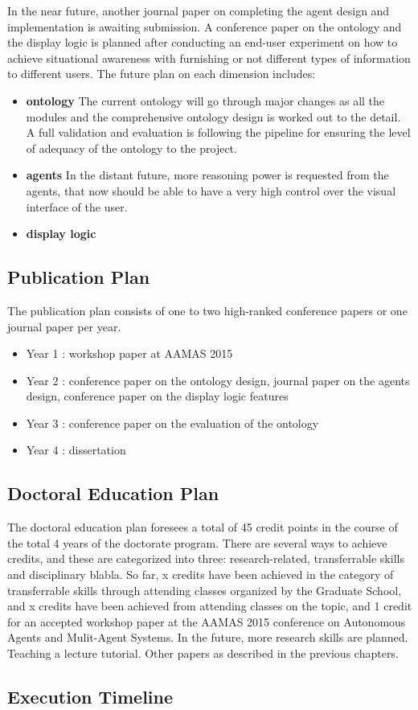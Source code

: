 In the near future, another journal paper on completing the agent design and implementation is awaiting submission. A conference paper on the ontology and the display logic is planned after conducting an end-user experiment on how to achieve situational awareness with furnishing or not different types of information to different users.
The future plan on each dimension includes:
\begin{itemize}
\item \textbf{ontology}  The current ontology will go through major changes as all the modules and the comprehensive ontology design is worked out to the detail. A full validation and evaluation is following the pipeline for ensuring the level of adequacy of the ontology to the project.
\item \textbf{agents} In the distant future, more reasoning power is requested from the agents, that now should be able to have a very high control over the visual interface of the user. 
\item \textbf{display logic}
\end{itemize}

\subsection{Publication Plan}

The publication plan consists of one to two high-ranked conference papers or one journal paper per year. 
\begin{itemize}
\item Year 1 : workshop paper at AAMAS 2015
\item Year 2 : conference paper on the ontology design, journal paper on the agents design, conference paper on the display logic features
\item Year 3 : conference paper on the evaluation of the ontology
\item Year 4 : dissertation 
\end{itemize}

\subsection{Doctoral Education Plan}
The doctoral education plan foresees a total of 45 credit points in the course of the total 4 years of the doctorate program. There are several ways to achieve credits, and these are categorized into three: research-related, transferrable skills and disciplinary blabla. So far, x credits have been achieved in the category of transferrable skills through attending classes organized by the Graduate School, and x credits have been achieved from attending classes on the topic, and 1 credit for an accepted workshop paper at the AAMAS 2015 conference on Autonomous Agents and Mulit-Agent Systems.
In the future, more research skills are planned.
Teaching a lecture tutorial.
Other papers as described in the previous chapters.

  
\subsection{Execution Timeline}  
  
  
  